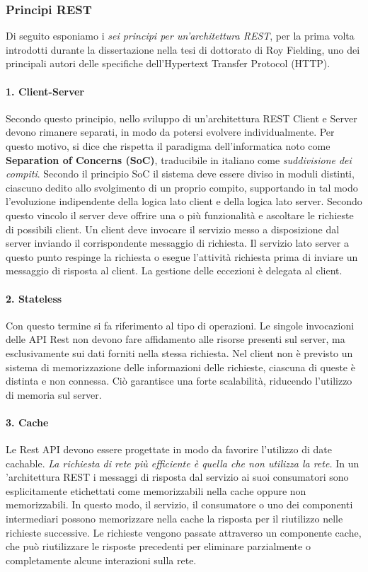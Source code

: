 \subsubsection{Principi REST}
Di seguito esponiamo i \textit{sei principi per un'architettura REST}, per la prima volta introdotti durante la dissertazione nella tesi di dottorato di Roy Fielding, uno dei principali autori delle specifiche dell'Hypertext Transfer Protocol (HTTP). \cite{fielding:restprinciples}

\paragraph{1. Client-Server} Secondo questo principio, nello sviluppo di un'architettura REST Client e Server devono rimanere separati, in modo da potersi evolvere individualmente. Per questo motivo, si dice che rispetta il paradigma dell'informatica noto come \textbf{Separation of Concerns (SoC)}, traducibile in italiano come \emph{suddivisione dei compiti}. Secondo il principio SoC il sistema deve essere diviso in moduli distinti, ciascuno dedito allo svolgimento di un proprio compito, supportando in tal modo l’evoluzione indipendente della logica lato client e della logica lato server. Secondo questo vincolo il server deve offrire una o più funzionalità e ascoltare le richieste di possibili client. Un client deve invocare il servizio messo a disposizione dal server inviando il corrispondente messaggio di richiesta. Il servizio lato server a questo punto respinge la richiesta o esegue l’attività richiesta prima di inviare un messaggio di risposta al client. La gestione delle eccezioni è delegata al client.

\paragraph{2. Stateless} Con questo termine si fa riferimento al tipo di operazioni. Le singole invocazioni delle API Rest non devono fare affidamento alle risorse presenti sul server, ma esclusivamente sui dati forniti nella stessa richiesta. Nel client non è previsto un sistema di memorizzazione delle informazioni delle richieste, ciascuna di queste è distinta e non connessa. Ciò garantisce una forte scalabilità, riducendo l'utilizzo di memoria sul server.

\paragraph{3. Cache} Le Rest API devono essere progettate in modo da favorire l'utilizzo di date cachable. \emph{La richiesta di rete più efficiente è quella che non utilizza la rete.} In un 'architettura REST i messaggi di risposta dal servizio ai suoi consumatori sono esplicitamente etichettati come memorizzabili nella cache oppure non memorizzabili. In questo modo, il servizio, il consumatore o uno dei componenti intermediari possono memorizzare nella cache la risposta per il riutilizzo nelle richieste successive. Le richieste vengono passate attraverso un componente cache, che può riutilizzare le risposte precedenti per eliminare parzialmente o completamente alcune interazioni sulla rete.

